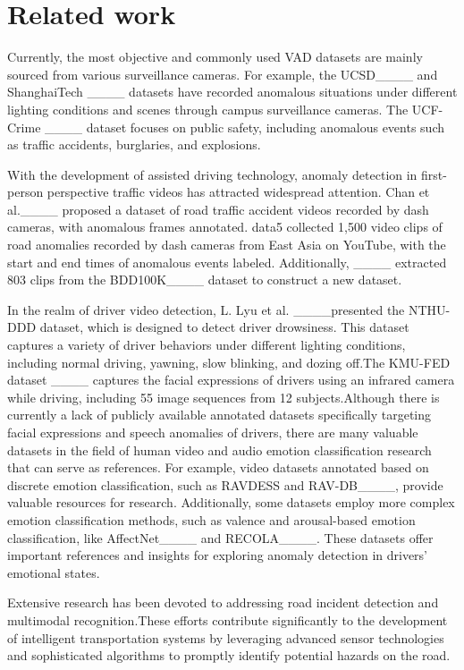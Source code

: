 \section{Related work}
Currently, the most objective and commonly used VAD datasets are mainly sourced from various surveillance cameras. For example, the UCSD____ and ShanghaiTech ____ datasets have recorded anomalous situations under different lighting conditions and scenes through campus surveillance cameras. The UCF-Crime ____ dataset focuses on public safety, including anomalous events such as traffic accidents, burglaries, and explosions.


With the development of assisted driving technology, anomaly detection in first-person perspective traffic videos has attracted widespread attention. Chan et al.____ proposed a dataset of road traffic accident videos recorded by dash cameras, with anomalous frames annotated. {data5} collected 1,500 video clips of road anomalies recorded by dash cameras from East Asia on YouTube, with the start and end times of anomalous events labeled. Additionally, ____ extracted 803 clips from the BDD100K____ dataset to construct a new dataset.

In the realm of driver video detection, L. Lyu et al. ____presented the NTHU-DDD dataset, which is designed to detect driver drowsiness. This dataset captures a variety of driver behaviors under different lighting conditions, including normal driving, yawning, slow blinking, and dozing off.The KMU-FED dataset ____ captures the facial expressions of drivers using an infrared camera while driving, including 55 image sequences from 12 subjects.Although there is currently a lack of publicly available annotated datasets specifically targeting facial expressions and speech anomalies of drivers, there are many valuable datasets in the field of human video and audio emotion classification research that can serve as references. For example, video datasets annotated based on discrete emotion classification, such as RAVDESS and RAV-DB____, provide valuable resources for research. Additionally, some datasets employ more complex emotion classification methods, such as valence and arousal-based emotion classification, like AffectNet____ and RECOLA____. These datasets offer important references and insights for exploring anomaly detection in drivers' emotional states.

Extensive research has been devoted to addressing road incident detection and multimodal recognition.These efforts contribute significantly to the development of intelligent transportation systems by leveraging advanced sensor technologies and sophisticated algorithms to promptly identify potential hazards on the road.

